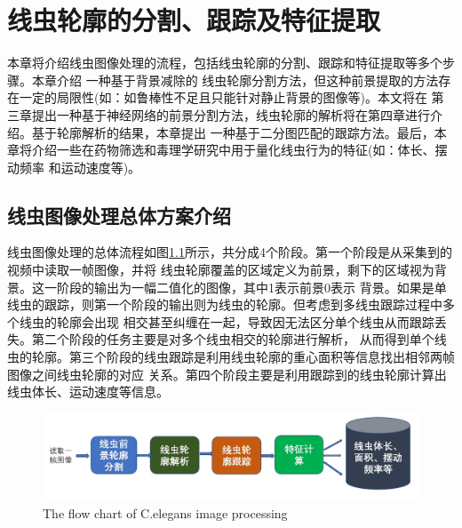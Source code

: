 \chapter{线虫轮廓的分割、跟踪及特征提取}
	本章将介绍线虫图像处理的流程，包括线虫轮廓的分割、跟踪和特征提取等多个步骤。本章介绍 一种基于背景减除的
	线虫轮廓分割方法，但这种前景提取的方法存在一定的局限性(如：如鲁棒性不足且只能针对静止背景的图像等)。本文将在
	第三章提出一种基于神经网络的前景分割方法，线虫轮廓的解析将在第四章进行介绍。基于轮廓解析的结果，本章提出
	一种基于二分图匹配的跟踪方法。最后，本章将介绍一些在药物筛选和毒理学研究中用于量化线虫行为的特征(如：体长、摆动频率
	和运动速度等)。
\section{线虫图像处理总体方案介绍}
	线虫图像处理的总体流程如图\ref{fig:flow}所示，共分成4个阶段。第一个阶段是从采集到的视频中读取一帧图像，并将
	线虫轮廓覆盖的区域定义为前景，剩下的区域视为背景。这一阶段的输出为一幅二值化的图像，其中1表示前景0表示
	背景。如果是单线虫的跟踪，则第一个阶段的输出则为线虫的轮廓。但考虑到多线虫跟踪过程中多个线虫的轮廓会出现
	相交甚至纠缠在一起，导致因无法区分单个线虫从而跟踪丢失。第二个阶段的任务主要是对多个线虫相交的轮廓进行解析，
	从而得到单个线虫的轮廓。第三个阶段的线虫跟踪是利用线虫轮廓的重心面积等信息找出相邻两帧图像之间线虫轮廓的对应
	关系。第四个阶段主要是利用跟踪到的线虫轮廓计算出线虫体长、运动速度等信息。

		\begin{figure}[h]
	  \centering
	  \includegraphics[width=14cm]{figure/chap3/flow.jpg}
		{The flow chart of C.elegans image processing}
	  \label{fig:flow}
	\end{figure}
